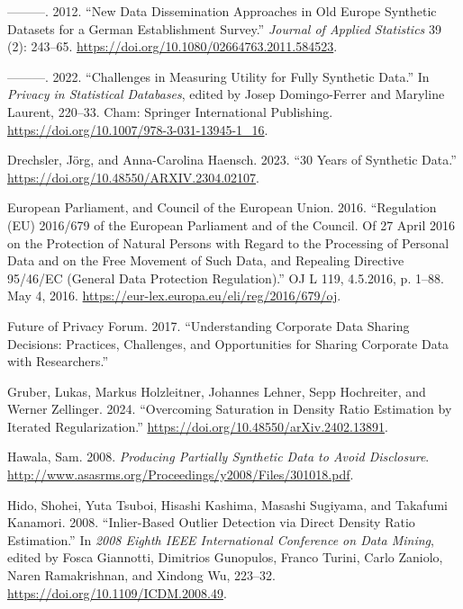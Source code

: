 \documentclass[
]{article}
\newlength{\cslhangindent}
\newlength{\cslentryspacingunit} %
\newenvironment{CSLReferences}[2] %
 {%
  \setlength{\parindent}{0pt}
  \ifodd #1
  \let\oldpar\par
  \def\par{\hangindent=\cslhangindent\oldpar}
  \fi
  \setlength{\parskip}{#2\cslentryspacingunit}
 }%
 {}
\begin{document}
\begin{CSLReferences}{1}{0}
\leavevmode{}%
---------. 2012. {``New Data Dissemination Approaches in Old Europe
{\textendash} Synthetic Datasets for a German Establishment Survey.''}
\emph{Journal of Applied Statistics} 39 (2): 243--65.
\url{https://doi.org/10.1080/02664763.2011.584523}.

\leavevmode{}%
---------. 2022. {``Challenges in Measuring Utility for Fully Synthetic
Data.''} In \emph{Privacy in Statistical Databases}, edited by Josep
Domingo-Ferrer and Maryline Laurent, 220--33. Cham: Springer
International Publishing.
\url{https://doi.org/10.1007/978-3-031-13945-1_16}.

\leavevmode{}%
Drechsler, Jörg, and Anna-Carolina Haensch. 2023. {``30 Years of
Synthetic Data.''} \url{https://doi.org/10.48550/ARXIV.2304.02107}.

\leavevmode{}%
European Parliament, and Council of the European Union. 2016.
{``Regulation ({EU}) 2016/679 of the {European} {Parliament} and of the
{Council}. Of 27 {April} 2016 on the Protection of Natural Persons with
Regard to the Processing of Personal Data and on the Free Movement of
Such Data, and Repealing {Directive} 95/46/{EC} ({General} {Data}
{Protection} {Regulation}).''} OJ L 119, 4.5.2016, p. 1--88. May 4,
2016. \url{https://eur-lex.europa.eu/eli/reg/2016/679/oj}.

\leavevmode{}%
Future of Privacy Forum. 2017. {``Understanding Corporate Data Sharing
Decisions: Practices, Challenges, and Opportunities for Sharing
Corporate Data with Researchers.''}

\leavevmode{}%
Gruber, Lukas, Markus Holzleitner, Johannes Lehner, Sepp Hochreiter, and
Werner Zellinger. 2024. {``Overcoming Saturation in Density Ratio
Estimation by Iterated Regularization.''}
\url{https://doi.org/10.48550/arXiv.2402.13891}.

\leavevmode{}%
Hawala, Sam. 2008. \emph{Producing Partially Synthetic Data to Avoid
Disclosure}.
\url{http://www.asasrms.org/Proceedings/y2008/Files/301018.pdf}.

\leavevmode{}%
Hido, Shohei, Yuta Tsuboi, Hisashi Kashima, Masashi Sugiyama, and
Takafumi Kanamori. 2008. {``Inlier-Based Outlier Detection via Direct
Density Ratio Estimation.''} In \emph{2008 Eighth IEEE International
Conference on Data Mining}, edited by Fosca Giannotti, Dimitrios
Gunopulos, Franco Turini, Carlo Zaniolo, Naren Ramakrishnan, and Xindong
Wu, 223--32. \url{https://doi.org/10.1109/ICDM.2008.49}.


\end{CSLReferences}
\end{document}
